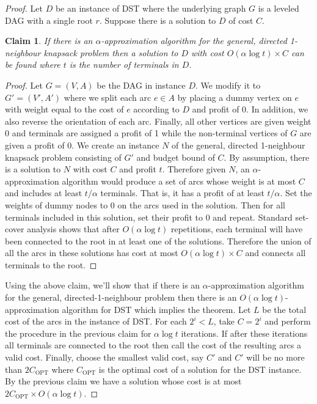 \documentclass[12pt]{article}
\newtheorem{claim}[theorem]{Claim}
\newcommand{\OPT}{\ensuremath{\mathrm{OPT}\xspace}}
\newcommand{\DST}{{DST}\xspace}
\begin{document}
\begin{proof}
Let $D$ be an instance of \DST where the underlying graph $G$ is a leveled DAG with a single root $r$.  Suppose there is a solution to $D$ of cost $C$.

\begin{claim} \label{claim:cover}
If there is an $\alpha$-approximation algorithm for
the general, directed 1-neighbour knapsack problem then a solution
to $D$ with cost $O(\alpha \log t)\times C$ can be found where $t$
is the number of terminals in $D$.
\end{claim}

\begin{proof}
Let $G=(V,A)$ be the DAG in instance $D$.  We modify it to
$G'=(V',A')$ where we split each arc $e\in A$ by placing a dummy
vertex on $e$ with weight equal to the cost of $e$ according to $D$
and profit of 0.  In addition, we also reverse the orientation of each arc.
Finally, all other vertices are given weight 0 and terminals are assigned
a profit of 1 while the non-terminal vertices
of $G$ are given a profit of 0.  We create an instance $N$ of the
general, directed 1-neighbour knapsack problem consisting of $G'$
and budget bound of $C$.  By assumption, there is a solution to $N$
with cost $C$ and profit $t$.  Therefore given $N$, an
$\alpha$-approximation algorithm would produce a set of arcs whose
weight is at most $C$ and includes at least $t/\alpha$ terminals.
That is, it has a profit of at least $t/\alpha$.  Set the weights of
dummy nodes to 0 on the arcs used in the solution. Then for all
terminals included in this solution, set their profit to 0 and
repeat.  Standard set-cover analysis shows that after $O(\alpha \log
t)$ repetitions, each terminal will have been connected to the root
in at least one of the solutions.  Therefore the union of all the
arcs in these solutions has cost at most $O(\alpha \log t)\times C$
and connects all terminals to the root.
\hfill  \end{proof}
Using the above claim, we'll show that if there is an $\alpha$-approximation algorithm for the general, directed-1-neighbour problem then there is an $O(\alpha \log
t)$-approximation algorithm for \DST which implies the theorem.  Let $L$ be the total cost of the arcs in the instance of \DST.  For
each $2^i < L$, take $C=2^i$ and perform the procedure in the previous claim for $\alpha \log t$ iterations.  If after
these iterations all terminals are connected to the root then call
the cost of the resulting arcs a valid cost.  Finally, choose the
smallest valid cost, say $C'$ and $C'$ will be no more than
$2C_{\OPT}$ where $C_{\OPT}$ is the optimal cost of a solution for
the \DST instance.  By the previous claim we have a solution
whose cost is at most $2C_{\OPT} \times O(\alpha \log t)$.
\hfill  \end{proof}
\end{document}
